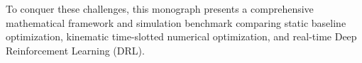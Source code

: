 To conquer these challenges, this monograph presents a comprehensive mathematical framework and simulation benchmark comparing static baseline optimization, kinematic time-slotted numerical optimization, and real-time Deep Reinforcement Learning (DRL).

